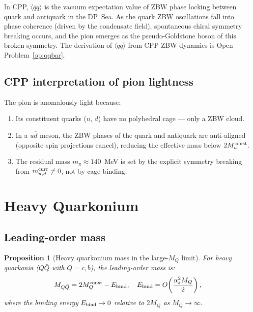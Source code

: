 \documentclass[11pt,a4paper]{article}
\newtheorem{proposition}[theorem]{Proposition}
\newcommand{\as}{\alpha_s}
\newcommand{\qqbar}{\langle\bar{q}q\rangle}
\begin{document}
In CPP, $\qqbar$ is the vacuum expectation value of
ZBW phase locking between quark and antiquark in the DP~Sea.
As the quark ZBW oscillations fall into phase coherence
(driven by the condensate field), spontaneous chiral symmetry
breaking occurs, and the pion emerges as the pseudo-Goldstone
boson of this broken symmetry.  The derivation of $\qqbar$ from
CPP ZBW dynamics is Open Problem~\ref{op:qqbar}.

\subsection{CPP interpretation of pion lightness}

The pion is anomalously light because:
\begin{enumerate}
\item Its constituent quarks ($u$, $d$) have no polyhedral cage ---
  only a ZBW cloud.
\item In a $u\bar{d}$ meson, the ZBW phases of the quark and
  antiquark are anti-aligned (opposite spin projections cancel),
  reducing the effective mass below $2M_u^{\rm const}$.
\item The residual mass $m_\pi \approx 140$~MeV is set by the
  explicit symmetry breaking from $m_{u,d}^{\rm curr} \neq 0$,
  not by cage binding.
\end{enumerate}

\section{Heavy Quarkonium}
\label{sec:quarkonium}

\subsection{Leading-order mass}

\begin{proposition}[Heavy quarkonium mass in the large-$M_Q$ limit]
\label{prop:quarkonium}
For heavy quarkonia ($Q\bar{Q}$ with $Q = c, b$), the leading-order
mass is:
\begin{equation}
M_{Q\bar{Q}} = 2M_Q^{\rm const} - E_{\rm bind},\quad
E_{\rm bind} = O\!\left(\frac{\as^2 M_Q}{2}\right),
\label{eq:quarkonium}
\end{equation}
where the binding energy $E_{\rm bind} \to 0$ relative to $2M_Q$
as $M_Q \to \infty$.
\end{proposition}
\end{document}
